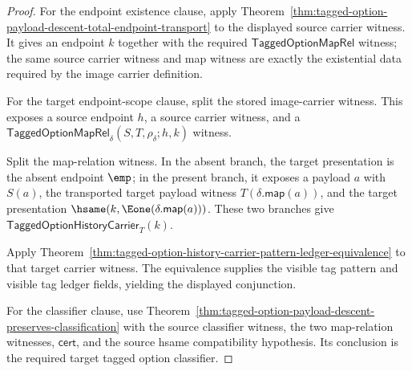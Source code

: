 \begin{proof}
For the endpoint existence clause, apply
Theorem~\ref{thm:tagged-option-payload-descent-total-endpoint-transport} to
the displayed source carrier witness. It gives an endpoint $k$ together with
the required $\mathsf{TaggedOptionMapRel}$ witness; the same source carrier
witness and map witness are exactly the existential data required by the image
carrier definition.

For the target endpoint-scope clause, split the stored image-carrier witness.
This exposes a source endpoint $h$, a source carrier witness, and a
$\mathsf{TaggedOptionMapRel}_{\delta}(S,T,\rho_{\delta};h,k)$ witness.

Split the map-relation witness. In the absent branch, the target presentation
is the absent endpoint $\emp$; in the present branch, it exposes a payload
$a$ with $S(a)$, the transported target payload witness
$T(\delta.\mathsf{map}(a))$, and the target presentation
$\hsame(k,\Eone(\delta.\mathsf{map}(a)))$. These two branches give
$\mathsf{TaggedOptionHistoryCarrier}_T(k)$.

Apply
Theorem~\ref{thm:tagged-option-history-carrier-pattern-ledger-equivalence} to
that target carrier witness. The equivalence supplies the visible tag pattern
and visible tag ledger fields, yielding the displayed conjunction.

For the classifier clause, use
Theorem~\ref{thm:tagged-option-payload-descent-preserves-classification} with
the source classifier witness, the two map-relation witnesses,
$\mathsf{cert}$, and the source hsame compatibility hypothesis. Its conclusion
is the required target tagged option classifier.
\end{proof}


